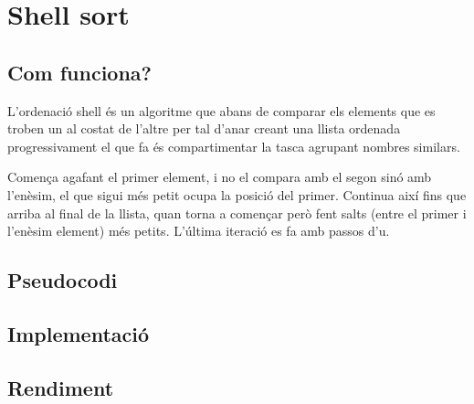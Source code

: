 \chapter{Shell sort}

\section{Com funciona?}
L'ordenació shell és un algoritme que abans de comparar els elements que es troben un al costat de l'altre per tal d'anar creant una llista ordenada progressivament el que fa és compartimentar la tasca agrupant nombres similars.

Comença agafant el primer element, i no el compara amb el segon sinó amb l'enèsim, el que sigui més petit ocupa la posició del primer. Continua així fins que arriba al final de la llista, quan torna a començar però fent salts (entre el primer i l'enèsim element) més petits.
L'última iteració es fa amb passos d'u.

\section{Pseudocodi}
\section{Implementació}

\section{Rendiment}
